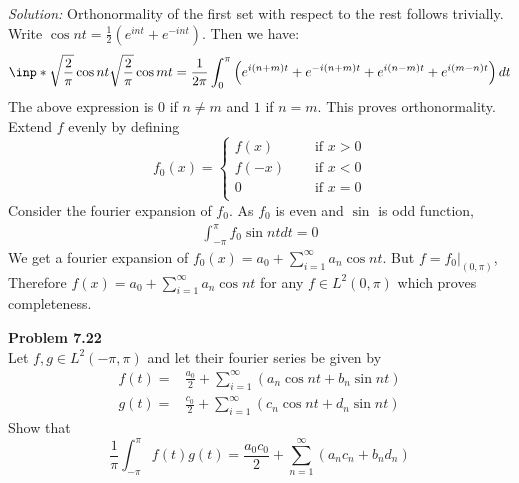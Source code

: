 \documentclass[a4paper, 11pt]{article}
\newenvironment{problem}[2][Problem]
    { \begin{mdframed}[backgroundcolor=gray!20] \textbf{#1 #2} \\}
    {  \end{mdframed}}
\newenvironment{solution}
    {\textit{Solution:}}
    {}
\begin{document}
\begin{solution}
    Orthonormality of the first set with respect to the rest follows trivially. Write $\cos nt=\frac{1}{2}(e^{int}+e^{-int})$. Then we have:
    \begin{align*}
        \inp*{\sqrt\frac{2}{{\pi}}\cos nt}{\sqrt\frac{2}{{\pi}}\cos mt}=\frac{1}{2\pi}\int_{0}^\pi\left(e^{i(n+m)t}+e^{-i(n+m)t}+e^{i(n-m)t}+e^{i(m-n)t}\right)dt
    \end{align*}
    The above expression is 0 if $n\ne m$ and $1$ if $n=m$. This proves orthonormality. Extend $f$ evenly by defining
    $$f_0(x)=\begin{cases}
        f(x)&\quad\text{ if }x>0\\
        f(-x)&\quad\text{ if }x<0\\
        0&\quad\text{ if }x=0\\
    \end{cases}$$
    Consider the fourier expansion of  $f_0$. As $f_0$ is even and $\sin$ is odd function,
    \begin{align*}
        \int_{-\pi}^\pi f_0\sin nt dt=0
    \end{align*}
    We get a fourier expansion of $f_0(x)=a_0+\sum_{i=1}^\infty a_n\cos nt$. But $f=f_0|_{(0,\pi)}$, Therefore $f(x)=a_0+\sum_{i=1}^\infty a_n\cos nt$ for any $f\in L^2(0,\pi)$ which proves completeness. 
\end{solution}
\begin{problem}{7.22}
Let $f,g\in L^2(-\pi,\pi)$ and let their fourier series be given by  
\begin{align*}
    f(t)=&\frac{a_0}{2}+\sum_{i=1}^\infty(a_n\cos nt+b_n\sin nt)\\
    g(t)=&\frac{c_0}{2}+\sum_{i=1}^\infty(c_n\cos nt+d_n\sin nt)
\end{align*}
Show that 
$$\frac{1}{\pi}\int_{-\pi}^\pi f(t)g(t)=\frac{a_0c_0}{2}+\sum_{n=1}^\infty(a_nc_n+b_nd_n)$$
\end{problem}
\end{document}
